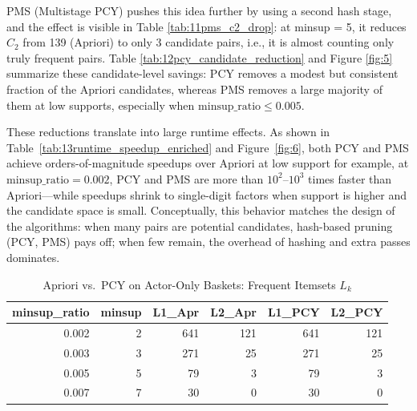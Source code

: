 \documentclass{article}  %
\begin{document}
PMS (Multistage PCY) pushes this idea further by using a second hash stage, and the effect is visible in Table \ref{tab:11pms_c2_drop}: at minsup = 5, it reduces \(C_2\) from 139 (Apriori) to only 3 candidate pairs, i.e., it is almost counting only truly frequent pairs. Table \ref{tab:12pcy_candidate_reduction} and Figure \ref{fig:5} summarize these candidate-level savings: PCY removes a modest but consistent fraction of the Apriori candidates, whereas PMS removes a large majority of them at low supports, especially when \(\mathrm{minsup\_ratio} \le 0.005\).

These reductions translate into large runtime effects. As shown in Table~\ref{tab:13runtime_speedup_enriched} and Figure~\ref{fig:6}, both PCY and PMS achieve orders-of-magnitude speedups over Apriori at low support for example, at \(\mathrm{minsup\_ratio} = 0.002\), PCY and PMS are more than
\(10^{2}\text{--}10^{3}\) times faster than Apriori—while speedups shrink to
single-digit factors when support is higher and the candidate space is small.
Conceptually, this behavior matches the design of the algorithms: when many
pairs are potential candidates, hash-based pruning (PCY, PMS) pays off; when
few remain, the overhead of hashing and extra passes dominates.

\begin{table}[!htbp]
    \caption{Apriori vs.\ PCY on Actor-Only Baskets: Frequent Itemsets \(L_k\)}
    \centering
    \begin{tabular}{rrrrrr}
        \toprule
        \textbf{minsup\_ratio} & \textbf{minsup} &
        \textbf{L1\_Apr} & \textbf{L2\_Apr} &
        \textbf{L1\_PCY} & \textbf{L2\_PCY} \\
        \midrule
        0.002 & 2 & 641 & 121 & 641 & 121 \\
        0.003 & 3 & 271 &  25 & 271 &  25 \\
        0.005 & 5 &  79 &   3 &  79 &   3 \\
        0.007 & 7 &  30 &   0 &  30 &   0 \\
        \bottomrule
    \end{tabular}
    \label{tab:9actors_Lk_apr_pcy}
\end{table}
\end{document}
